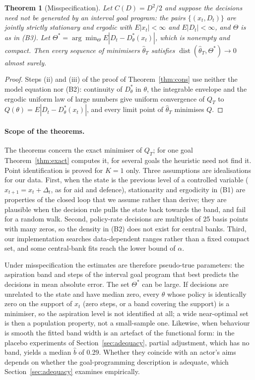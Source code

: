 \documentclass[pdflatex,sn-basic]{sn-jnl}
\theoremstyle{thmstyleone}\newtheorem{proposition}{Proposition}\newtheorem{theorem}{Theorem}
\theoremstyle{thmstylethree}\newtheorem{remark}{Remark}
\begin{document}
\begin{theorem}[Misspecification]\label{thm:misspec}
Let $C(D)=D^2/2$ and suppose the decisions need not be generated by an interval goal program: the pairs $\{(x_t,D_t)\}$ are jointly strictly stationary and ergodic with $E|x_t|<\infty$ and $E|D_t|<\infty$, and $\Theta$ is as in (B3). Let $\Theta^*=\arg\min_{\Theta}E|D_t-D^*_\theta(x_t)|$, which is nonempty and compact. Then every sequence of minimisers $\hat\theta_T$ satisfies $\operatorname{dist}(\hat\theta_T,\Theta^*)\to0$ almost surely.
\end{theorem}
\begin{proof}
Steps (ii) and (iii) of the proof of Theorem~\ref{thm:cons} use neither the model equation nor (B2): continuity of $D^*_\theta$ in $\theta$, the integrable envelope and the ergodic uniform law of large numbers give uniform convergence of $Q_T$ to $Q(\theta)=E|D_t-D^*_\theta(x_t)|$, and every limit point of $\hat\theta_T$ minimises $Q$.
\end{proof}
\paragraph{Scope of the theorems.} The theorems concern the exact minimiser of $Q_T$; for one goal Theorem~\ref{thm:exact} computes it, for several goals the heuristic need not find it. Point identification is proved for $K=1$ only. Three assumptions are idealisations for our data. First, when the state is the previous level of a controlled variable ($x_{t+1}=x_t+\Delta_t$, as for aid and defence), stationarity and ergodicity in (B1) are properties of the closed loop that we assume rather than derive; they are plausible when the decision rule pulls the state back towards the band, and fail for a random walk. Second, policy-rate decisions are multiples of 25 basis points with many zeros, so the density in (B2) does not exist for central banks. Third, our implementation searches data-dependent ranges rather than a fixed compact set, and some central-bank fits reach the lower bound of $\alpha$.

Under misspecification the estimates are therefore pseudo-true parameters: the aspiration band and steps of the interval goal program that best predicts the decisions in mean absolute error. The set $\Theta^*$ can be large. If decisions are unrelated to the state and have median zero, every $\theta$ whose policy is identically zero on the support of $x_t$ (zero steps, or a band covering the support) is a minimiser, so the aspiration level is not identified at all; a wide near-optimal set is then a population property, not a small-sample one. Likewise, when behaviour is smooth the fitted band width is an artefact of the functional form: in the placebo experiments of Section~\ref{sec:adequacy}, partial adjustment, which has no band, yields a median $\hat b$ of 0.29. Whether they coincide with an actor's aims depends on whether the goal-programming description is adequate, which Section~\ref{sec:adequacy} examines empirically.
\end{document}
